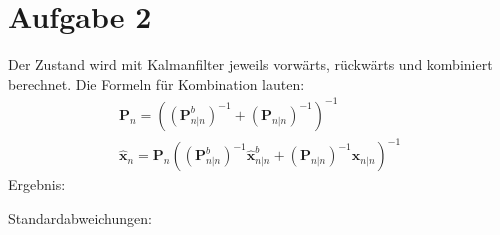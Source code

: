 \section{Aufgabe 2}
Der Zustand wird mit Kalmanfilter jeweils vorwärts, rückwärts und kombiniert berechnet. Die Formeln für Kombination lauten:
\begin{gather}
	\bm{P}_n = \left( \left(\bm{P}^b_{n|n}\right)^{-1} + \left(\bm{P}_{n|n}\right)^{-1}\right)^{-1} \\
	\hat{\bm{x}}_n = \bm{P}_n \left( \left(\bm{P}^b_{n|n}\right)^{-1} \hat{\bm{x}}^b_{n|n} + \left(\bm{P}_{n|n}\right)^{-1} \hat{\bm{x}}_{n|n} \right)^{-1}
\end{gather}
Ergebnis:
\begin{figure}[ht]\centering
	\label{fig:abstand}
\end{figure}
\clearpage
Standardabweichungen:
\begin{figure}[ht]\centering
\end{figure}